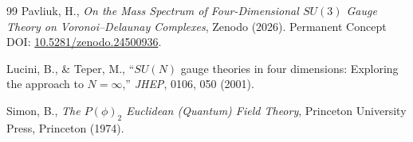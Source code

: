 \documentclass[11pt, a4paper]{article}
\theoremstyle{definition}
\theoremstyle{remark}
\begin{document}
\begin{thebibliography}{99}
Pavliuk, H., \textit{On the Mass Spectrum of Four-Dimensional $SU(3)$ Gauge Theory on Voronoi--Delaunay Complexes}, Zenodo (2026). Permanent Concept DOI: \href{https://doi.org/10.5281/zenodo.24500936}{10.5281/zenodo.24500936}.

Lucini, B., \& Teper, M., ``$SU(N)$ gauge theories in four dimensions: Exploring the approach to $N = \infty$,'' \textit{JHEP}, 0106, 050 (2001).

Simon, B., \textit{The $P(\phi)_{2}$ Euclidean (Quantum) Field Theory}, Princeton University Press, Princeton (1974).

\end{thebibliography}
\end{document}
